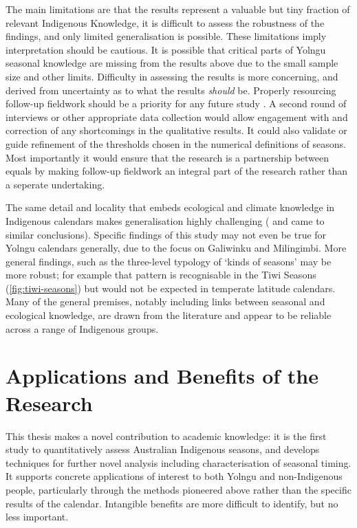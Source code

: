 The main limitations are that the results represent a valuable but tiny fraction
of relevant Indigenous Knowledge, it is difficult to assess the robustness
of the findings, and only limited generalisation is possible.  These
limitations imply interpretation should be cautious.  It is possible that
critical parts of Yolngu seasonal knowledge are missing from the results
above due to the small sample size and other limits.
%
Difficulty in assessing the results is more concerning, and derived from
uncertainty as to what the results \textit{should} be.   Properly resourcing
follow-up fieldwork should be a priority for any future study
\citep[see eg.][on engagement plans]{jackson2015}.  A second round
of interviews or other appropriate data collection would allow engagement
with and correction of any shortcomings in the qualitative results.
It could also validate or guide refinement of the thresholds chosen in the
numerical definitions of seasons.  Most importantly it would
ensure that the research is a partnership between equals by making follow-up
fieldwork an integral part of the research rather than a seperate undertaking.

The same detail and locality that embeds ecological and climate knowledge in
Indigenous calendars makes generalisation highly challenging
(\citealt{barber2005} and \citealt{davis1989} came to similar conclusions).  Specific
findings of this study may not even be true for Yolngu calendars generally,
due to the focus on Galiwinku and Milingimbi.  More general findings, such as
the three-level typology of `kinds of seasons' may be more robust; for example
that pattern is recognisable in the Tiwi Seasons (\cref{fig:tiwi-seasons})
but would not be expected in temperate latitude calendars.  Many of the general premises, notably
including links between seasonal and ecological knowledge, are drawn from the
literature and appear to be reliable across a range of Indigenous groups.




\section{Applications and Benefits of the Research}
\label{sec:applications-benefits}

This thesis makes a novel contribution to academic knowledge: it is the
first study to quantitatively assess Australian Indigenous seasons, and
develops techniques for further novel analysis including characterisation
of seasonal timing.
%
It supports concrete applications of interest to both Yolngu and
non-Indigenous people, particularly through the methods pioneered above
rather than the specific results of the calendar.  Intangible benefits
are more difficult to identify, but no less important.


